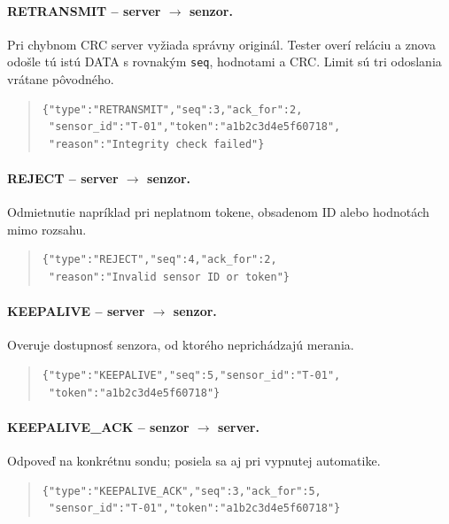 \documentclass[12pt,a4paper]{article}
\begin{document}
\paragraph{RETRANSMIT -- server $\rightarrow$ senzor.}
Pri chybnom CRC server vyžiada správny originál. Tester overí reláciu a znova odošle tú istú DATA s rovnakým \texttt{seq}, hodnotami a CRC. Limit sú tri odoslania vrátane pôvodného.
\begin{quote}\begin{minipage}{\linewidth}\small\singlespacing
\begin{verbatim}
{"type":"RETRANSMIT","seq":3,"ack_for":2,
 "sensor_id":"T-01","token":"a1b2c3d4e5f60718",
 "reason":"Integrity check failed"}
\end{verbatim}
\end{minipage}\end{quote}

\paragraph{REJECT -- server $\rightarrow$ senzor.}
Odmietnutie napríklad pri neplatnom tokene, obsadenom ID alebo hodnotách mimo rozsahu.
\begin{quote}\begin{minipage}{\linewidth}\small\singlespacing
\begin{verbatim}
{"type":"REJECT","seq":4,"ack_for":2,
 "reason":"Invalid sensor ID or token"}
\end{verbatim}
\end{minipage}\end{quote}

\paragraph{KEEPALIVE -- server $\rightarrow$ senzor.}
Overuje dostupnosť senzora, od ktorého neprichádzajú merania.
\begin{quote}\begin{minipage}{\linewidth}\small\singlespacing
\begin{verbatim}
{"type":"KEEPALIVE","seq":5,"sensor_id":"T-01",
 "token":"a1b2c3d4e5f60718"}
\end{verbatim}
\end{minipage}\end{quote}

\paragraph{KEEPALIVE\_ACK -- senzor $\rightarrow$ server.}
Odpoveď na konkrétnu sondu; posiela sa aj pri vypnutej automatike.
\begin{quote}\begin{minipage}{\linewidth}\small\singlespacing
\begin{verbatim}
{"type":"KEEPALIVE_ACK","seq":3,"ack_for":5,
 "sensor_id":"T-01","token":"a1b2c3d4e5f60718"}
\end{verbatim}
\end{minipage}\end{quote}
\end{document}
